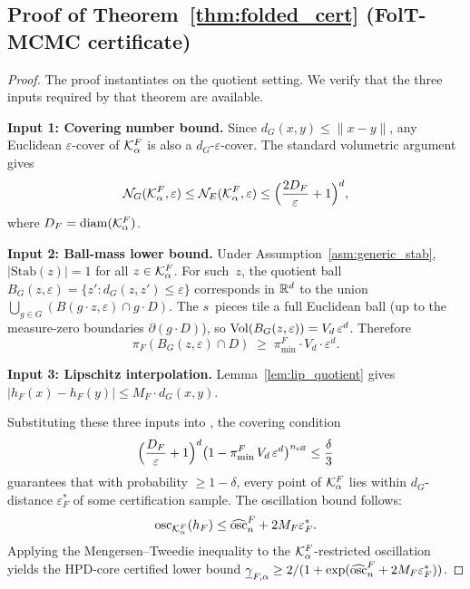 \subsection{Proof of Theorem~\ref{thm:folded_cert}
  (FolT-MCMC certificate)}
\label{app:proof_cert}

\begin{proof}
  The proof instantiates \citet[Theorem~5.1]{LCNF} on the quotient
  setting.  We verify that the three inputs required by that
  theorem are available.

  \textbf{Input 1: Covering number bound.}
  Since $d_G(x,y) \leq \|x - y\|$, any Euclidean
  $\varepsilon$-cover of $\mathcal{K}_\alpha^F$ is also a
  $d_G$-$\varepsilon$-cover.  The standard volumetric argument
  gives
  \[
    \mathcal{N}_G(\mathcal{K}_\alpha^F, \varepsilon)
    \leq \mathcal{N}_E(\mathcal{K}_\alpha^F, \varepsilon)
    \leq \Bigl(\frac{2D_F}{\varepsilon} + 1\Bigr)^d,
  \]
  where $D_F = \mathrm{diam}(\mathcal{K}_\alpha^F)$.

  \textbf{Input 2: Ball-mass lower bound.}
  Under Assumption~\ref{asm:generic_stab},
  $|\mathrm{Stab}(z)| = 1$ for all $z \in \mathcal{K}_\alpha^F$.
  For such~$z$, the quotient ball
  $B_G(z, \varepsilon) = \{z' : d_G(z, z') \leq \varepsilon\}$
  corresponds in $\mathbb{R}^d$ to the union
  $\bigcup_{g \in G}(B(g \cdot z, \varepsilon) \cap g \cdot D)$.
  The $s$~pieces tile a full Euclidean ball (up to the
  measure-zero boundaries $\partial(g \cdot D)$), so
  $\mathrm{Vol}(B_G(z,\varepsilon)) = V_d\,\varepsilon^d$.  Therefore
  \[
    \pi_F(B_G(z,\varepsilon) \cap D)
    \;\geq\;
    \pi_{\min}^F \cdot V_d \cdot \varepsilon^d.
  \]

  \textbf{Input 3: Lipschitz interpolation.}
  Lemma~\ref{lem:lip_quotient} gives
  $|h_F(x) - h_F(y)| \leq M_F \cdot d_G(x,y)$.

  Substituting these three inputs into
  \citet[Theorem~5.1]{LCNF}, the covering condition
  \[
    \Bigl(\frac{D_F}{\varepsilon} + 1\Bigr)^d
    \bigl(1 - \pi_{\min}^F\,V_d\,\varepsilon^d\bigr)^{n_{\mathrm{eff}}}
    \leq \frac{\delta}{3}
  \]
  guarantees that with probability $\geq 1 - \delta$,
  every point of $\mathcal{K}_\alpha^F$ lies within $d_G$-distance
  $\varepsilon_F^*$ of some certification sample.  The oscillation
  bound follows:
  \[
    \mathrm{osc}_{\mathcal{K}_\alpha^F}(h_F)
    \leq \widehat{\mathrm{osc}}_n^F + 2 M_F \varepsilon_F^*.
  \]
  Applying the Mengersen--Tweedie inequality
  \citep{MengersenTweedie1996} to the $\mathcal{K}_\alpha^F$-restricted
  oscillation yields the HPD-core certified lower bound
  $\underline{\gamma}_{F,\alpha}
  \geq 2/(1 + \exp(\widehat{\mathrm{osc}}_n^F + 2 M_F \varepsilon_F^*))$.
\end{proof}


